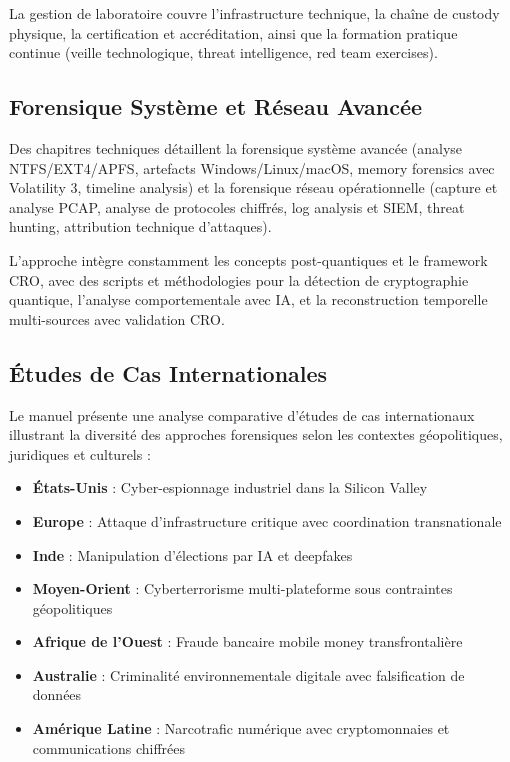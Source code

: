 \documentclass[12pt, a4paper]{article}
\begin{document}
La gestion de laboratoire couvre l'infrastructure technique, la chaîne de custody physique, la certification et accréditation, ainsi que la formation pratique continue (veille technologique, threat intelligence, red team exercises).

\subsection{Forensique Système et Réseau Avancée}
Des chapitres techniques détaillent la forensique système avancée (analyse NTFS/EXT4/APFS, artefacts Windows/Linux/macOS, memory forensics avec Volatility 3, timeline analysis) et la forensique réseau opérationnelle (capture et analyse PCAP, analyse de protocoles chiffrés, log analysis et SIEM, threat hunting, attribution technique d'attaques).

L'approche intègre constamment les concepts post-quantiques et le framework CRO, avec des scripts et méthodologies pour la détection de cryptographie quantique, l'analyse comportementale avec IA, et la reconstruction temporelle multi-sources avec validation CRO.

\subsection{Études de Cas Internationales}
Le manuel présente une analyse comparative d'études de cas internationaux illustrant la diversité des approches forensiques selon les contextes géopolitiques, juridiques et culturels :

\begin{itemize}
  \item \textbf{États-Unis} : Cyber-espionnage industriel dans la Silicon Valley
  \item \textbf{Europe} : Attaque d'infrastructure critique avec coordination transnationale
  \item \textbf{Inde} : Manipulation d'élections par IA et deepfakes
  \item \textbf{Moyen-Orient} : Cyberterrorisme multi-plateforme sous contraintes géopolitiques
  \item \textbf{Afrique de l'Ouest} : Fraude bancaire mobile money transfrontalière
  \item \textbf{Australie} : Criminalité environnementale digitale avec falsification de données
  \item \textbf{Amérique Latine} : Narcotrafic numérique avec cryptomonnaies et communications chiffrées
\end{itemize}
\end{document}
